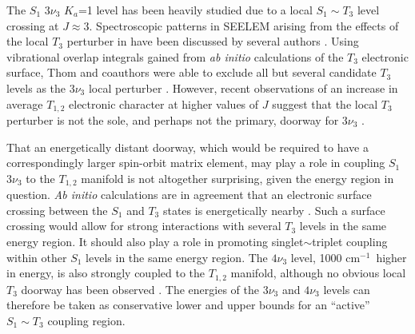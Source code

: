 \documentclass[12pt]{mitthesis}
\newcommand{\POINT}[1]{\textcolor{magenta}{\textbf{POINT:} #1}}
\newcommand{\rcm}{cm$^{-1}$}
\begin{document}
The $S_1$ $3 \nu_3$ $K_a$=1 level has been heavily studied due to a
local $S_1 \sim T_3$ level crossing at $J \approx 3$.  Spectroscopic
patterns in SEELEM arising from the effects of the local $T_3$
perturber in have been discussed by several authors \cite{humphrey97,
  altunata00, altunata01, mishra04}.  Using vibrational overlap
integrals gained from \emph{ab initio} calculations of the $T_3$
electronic surface, Thom and coauthors were able to exclude all but
several candidate $T_3$ levels as the $3\nu_3$ local perturber
\cite{thom07}.
However, recent observations of an increase in average $T_{1,2}$
electronic character at higher values of $J$ suggest that the local
$T_3$ perturber is not the sole, and perhaps not the primary, doorway
for $3 \nu_3$ \cite{degroot07}.

That an energetically distant doorway, which would be required to have
a correspondingly larger spin-orbit matrix element, may play a role in
coupling $S_1$ $3 \nu_3$ to the $T_{1,2}$ manifold is not altogether
surprising, given the energy region in question.  \emph{Ab initio}
calculations are in agreement that an electronic surface crossing
between the $S_1$ and $T_3$ states is energetically nearby
\cite{ventura03, thom07}.  Such a surface crossing would allow for
strong interactions with several $T_3$ levels in the same energy
region.  It should also play a role in promoting singlet$\sim$triplet
coupling within other $S_1$ levels in the same energy region.  The
$4\nu_3$ level, 1000 \rcm\ higher in energy, is also strongly coupled
to the $T_{1,2}$ manifold, although no obvious local $T_3$ doorway has
been observed \cite{drabbels94, ochi91}.  The energies of the $3
\nu_3$ and $4\nu_3$ levels can therefore be taken as conservative
lower and upper bounds for an ``active'' $S_1 \sim T_3$ coupling
region.
\end{document}

